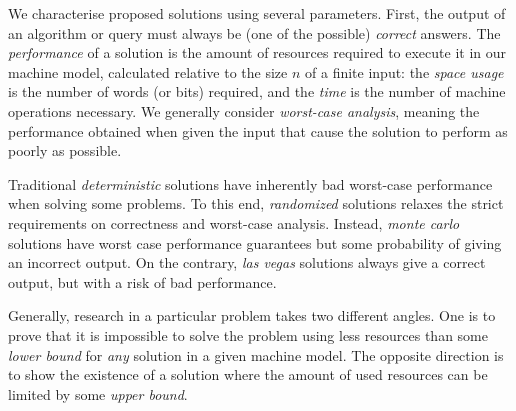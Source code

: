 We characterise proposed solutions using several parameters.
First, the output of an algorithm or query must always be (one of the possible) \emph{correct} answers.
The \emph{performance} of a solution is the amount of resources required to execute it in our machine model, calculated relative to the size $n$ of a finite input: the \emph{space usage} is the number of words (or bits) required, and the \emph{time} is the number of machine operations necessary. We generally consider \emph{worst-case analysis}, meaning the performance obtained when given the input that cause the solution to perform as poorly as possible.


Traditional \emph{deterministic} solutions have inherently bad worst-case performance when solving some problems. To this end, \emph{randomized} solutions relaxes the strict requirements on correctness and worst-case analysis. Instead, \emph{monte carlo} solutions have worst case performance guarantees but some probability of giving an incorrect output. On the contrary, \emph{las vegas} solutions always give a correct output, but with a risk of bad performance.

Generally, research in a particular problem takes two different angles. 
One is to prove that it is impossible to solve the problem using less resources than some \emph{lower bound} for \emph{any} solution in a given machine model. The opposite direction is to show the existence of a solution where the amount of used resources can be limited by some \emph{upper bound}. 

